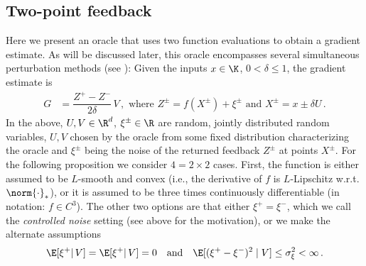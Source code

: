 \subsection{Two-point feedback}
Here we present an oracle that uses two function evaluations to obtain a gradient estimate. 
As will be discussed later, this oracle
 encompasses several simultaneous perturbation methods (see \cite{bhatnagar-book}):
Given the inputs $x\in \K$,  $0<\delta\le 1$,  
the gradient estimate is
\begin{align}
G &=  \dfrac{Z^+ - Z^-}{2\delta}\, V \,, \text{ where }  Z^{\pm} = f(X^{\pm}) + \xi^{\pm} \text{ and } X^{\pm} = x \pm \delta U\,.
 \label{eq:twosp}
\end{align}
In the above, $U,V\in \R^d$, $\xi^{\pm}\in \R$ are random, jointly distributed random variables, $U,V$ chosen by the oracle
from some fixed distribution characterizing the oracle and $\xi^{\pm}$ being the noise of the returned feedback $Z^{\pm}$ at points $X^{\pm}$.
For the following proposition we consider $4=2\times 2$ cases.
First, the function is either assumed to be $L$-smooth and convex (i.e., the derivative of $f$ is $L$-Lipschitz w.r.t. $\norm{\cdot}_*$), or it is assumed to be three times continuously differentiable (in notation: $f\in C^3$).
The other two options are that either $\xi^+=\xi^-$, which we call the \emph{controlled noise} setting (see above for the motivation), or we make the alternate assumptions 
\begin{align}
\E[\xi^+ |\, V] = \E[\xi^+ |\, V] =0 \text{~~ and ~~}\E [ (\xi^{+} - \xi^-)^{2} \mid V] \le \sigma_\xi^2 <\infty\,.
\label{eq:noiseass}
\end{align}

